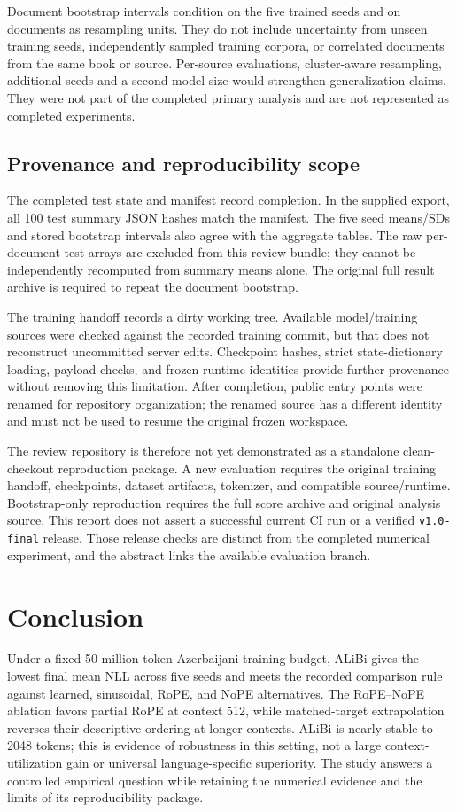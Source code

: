 \documentclass[conference]{IEEEtran}
\newcommand{\code}[1]{\texttt{#1}}
\begin{document}
Document bootstrap intervals condition on the five trained seeds and on documents as resampling units. They do not include uncertainty from unseen training seeds, independently sampled training corpora, or correlated documents from the same book or source. Per-source evaluations, cluster-aware resampling, additional seeds and a second model size would strengthen generalization claims. They were not part of the completed primary analysis and are not represented as completed experiments.

\subsection{Provenance and reproducibility scope}
The completed test state and manifest record completion. In the supplied export, all 100 test summary JSON hashes match the manifest. The five seed means/SDs and stored bootstrap intervals also agree with the aggregate tables. The raw per-document test arrays are excluded from this review bundle; they cannot be independently recomputed from summary means alone. The original full result archive is required to repeat the document bootstrap.

The training handoff records a dirty working tree. Available model/training sources were checked against the recorded training commit, but that does not reconstruct uncommitted server edits. Checkpoint hashes, strict state-dictionary loading, payload checks, and frozen runtime identities provide further provenance without removing this limitation. After completion, public entry points were renamed for repository organization; the renamed source has a different identity and must not be used to resume the original frozen workspace.

The review repository is therefore not yet demonstrated as a standalone clean-checkout reproduction package. A new evaluation requires the original training handoff, checkpoints, dataset artifacts, tokenizer, and compatible source/runtime. Bootstrap-only reproduction requires the full score archive and original analysis source. This report does not assert a successful current CI run or a verified \code{v1.0-final} release. Those release checks are distinct from the completed numerical experiment, and the abstract links the available evaluation branch.

\balance
\section{Conclusion}
Under a fixed 50-million-token Azerbaijani training budget, ALiBi gives the lowest final mean NLL across five seeds and meets the recorded comparison rule against learned, sinusoidal, RoPE, and NoPE alternatives. The RoPE--NoPE ablation favors partial RoPE at context 512, while matched-target extrapolation reverses their descriptive ordering at longer contexts. ALiBi is nearly stable to 2048 tokens; this is evidence of robustness in this setting, not a large context-utilization gain or universal language-specific superiority. The study answers a controlled empirical question while retaining the numerical evidence and the limits of its reproducibility package.
\end{document}
